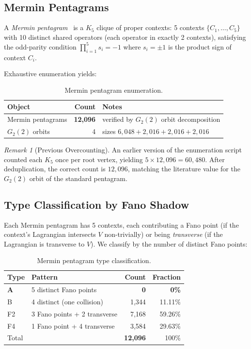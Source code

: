 \documentclass[11pt,a4paper]{article}
\theoremstyle{remark}
\newtheorem{remark}[theorem]{Remark}
\begin{document}
\subsection{Mermin Pentagrams}

A \emph{Mermin pentagram}~\cite{Mermin1990} is a $K_5$ clique of proper contexts:
5 contexts $\{C_1, \ldots, C_5\}$ with 10 distinct shared operators
(each operator in exactly 2 contexts), satisfying the odd-parity
condition $\prod_{i=1}^5 s_i = -1$ where $s_i = \pm 1$ is the product
sign of context $C_i$.

Exhaustive enumeration yields:

\begin{table}[h]
\centering
\begin{tabular}{l r l}
\toprule
Object & Count & Notes \\
\midrule
Mermin pentagrams & \textbf{12{,}096} & verified by $G_2(2)$ orbit decomposition \\
$G_2(2)$ orbits & 4 & sizes $6{,}048 + 2{,}016 + 2{,}016 + 2{,}016$ \\
\bottomrule
\end{tabular}
\caption{Mermin pentagram enumeration.}
\label{tab:mermin-count}
\end{table}

\begin{remark}[Previous Overcounting]
An earlier version of the enumeration script counted each $K_5$ once
per root vertex, yielding $5 \times 12{,}096 = 60{,}480$. After
deduplication, the correct count is $12{,}096$, matching the
literature value for the $G_2(2)$ orbit of the standard pentagram.
\end{remark}

\subsection{Type Classification by Fano Shadow}

Each Mermin pentagram has 5 contexts, each contributing a Fano point
(if the context's Lagrangian intersects $V$ non-trivially) or being
\emph{transverse} (if the Lagrangian is transverse to $V$). We classify
by the number of distinct Fano points:

\begin{table}[h]
\centering
\begin{tabular}{l l r r}
\toprule
Type & Pattern & Count & Fraction \\
\midrule
\textbf{A} & 5 distinct Fano points & \textbf{0} & \textbf{0\%} \\
B & 4 distinct (one collision) & 1{,}344 & 11.11\% \\
F2 & 3 Fano points + 2 transverse & 7{,}168 & 59.26\% \\
F4 & 1 Fano point + 4 transverse & 3{,}584 & 29.63\% \\
\midrule
Total & & \textbf{12{,}096} & 100\% \\
\bottomrule
\end{tabular}
\caption{Mermin pentagram type classification.}
\label{tab:type-classification}
\end{table}
\end{document}
